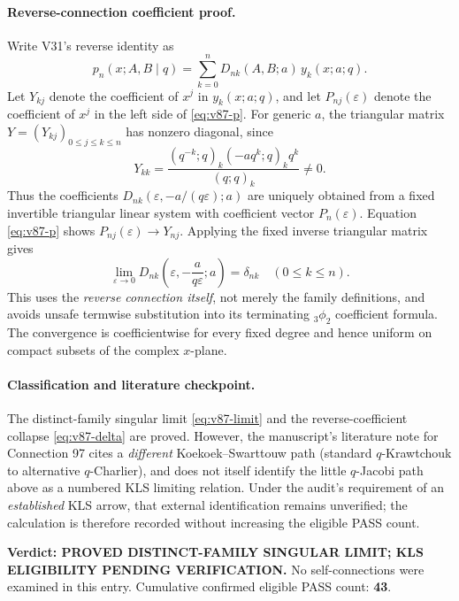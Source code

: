 \documentclass[11pt]{article}
\begin{document}
\paragraph{Reverse-connection coefficient proof.}
Write V31's reverse identity as
\begin{equation}\label{eq:v87-reverse}
 p_n(x;A,B\mid q)=\sum_{k=0}^n D_{nk}(A,B;a)\,y_k(x;a;q).
\end{equation}
Let $Y_{kj}$ denote the coefficient of $x^j$ in $y_k(x;a;q)$, and let $P_{nj}(\varepsilon)$ denote the coefficient of $x^j$ in the left side of \eqref{eq:v87-p}. For generic $a$, the triangular matrix $Y=(Y_{kj})_{0\le j\le k\le n}$ has nonzero diagonal, since
\[
 Y_{kk}=\frac{(q^{-k};q)_k(-aq^k;q)_k q^k}{(q;q)_k}\ne0.
\]
Thus the coefficients $D_{nk}(\varepsilon,-a/(q\varepsilon);a)$ are uniquely obtained from a fixed invertible triangular linear system with coefficient vector $P_n(\varepsilon)$. Equation \eqref{eq:v87-p} shows $P_{nj}(\varepsilon)\to Y_{nj}$. Applying the fixed inverse triangular matrix gives
\begin{equation}\label{eq:v87-delta}
 \boxed{\displaystyle\lim_{\varepsilon\to0}
 D_{nk}\left(\varepsilon,-\frac{a}{q\varepsilon};a\right)=\delta_{nk}
 \quad(0\le k\le n).}
\end{equation}
This uses the \emph{reverse connection itself}, not merely the family definitions, and avoids unsafe termwise substitution into its terminating ${}_3\phi_2$ coefficient formula. The convergence is coefficientwise for every fixed degree and hence uniform on compact subsets of the complex $x$-plane.

\paragraph{Classification and literature checkpoint.}
The distinct-family singular limit \eqref{eq:v87-limit} and the reverse-coefficient collapse \eqref{eq:v87-delta} are proved. However, the manuscript's literature note for Connection 97 cites a \emph{different} Koekoek--Swarttouw path (standard $q$-Krawtchouk to alternative $q$-Charlier), and does not itself identify the little $q$-Jacobi path above as a numbered KLS limiting relation. Under the audit's requirement of an \emph{established} KLS arrow, that external identification remains unverified; the calculation is therefore recorded without increasing the eligible PASS count.

\noindent\textbf{Verdict: PROVED DISTINCT-FAMILY SINGULAR LIMIT; KLS ELIGIBILITY PENDING VERIFICATION.} No self-connections were examined in this entry. Cumulative confirmed eligible PASS count: \textbf{43}.
\end{document}
